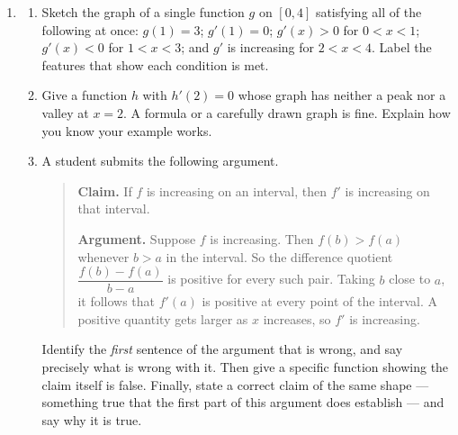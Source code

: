 \documentclass[11pt]{article}
\begin{document}
\begin{enumerate}[resume]
\item[]
\begin{enumerate}
\item Sketch the graph of a single function $g$ on $[0,4]$ satisfying all of the
following at once: $g(1) = 3$; $g'(1) = 0$; $g'(x) > 0$ for $0 < x < 1$;
$g'(x) < 0$ for $1 < x < 3$; and $g'$ is increasing for $2 < x < 4$. Label the
features that show each condition is met.

\item Give a function $h$ with $h'(2) = 0$ whose graph has neither a peak nor a
valley at $x = 2$. A formula or a carefully drawn graph is fine. Explain how you know
your example works.

\item A student submits the following argument.

\smallskip
\begin{quote}
\textbf{Claim.} If $f$ is increasing on an interval, then $f'$ is increasing on that
interval.

\textbf{Argument.} Suppose $f$ is increasing. Then $f(b) > f(a)$ whenever $b > a$ in
the interval. So the difference quotient $\dfrac{f(b)-f(a)}{b-a}$ is positive for every
such pair. Taking $b$ close to $a$, it follows that $f'(a)$ is positive at every point
of the interval. A positive quantity gets larger as $x$ increases, so $f'$ is increasing.
\end{quote}
\smallskip

Identify the \emph{first} sentence of the argument that is wrong, and say precisely
what is wrong with it. Then give a specific function showing the claim itself is
false. Finally, state a correct claim of the same shape --- something true that the
first part of this argument does establish --- and say why it is true.
\end{enumerate}
\end{enumerate}
\end{document}
